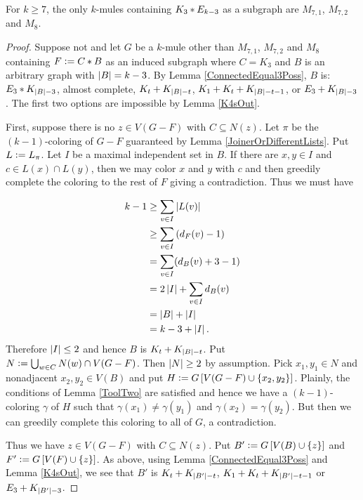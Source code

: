 \begin{lem}\label{K3sOut}
For $k \geq 7$, the only $k$-mules containing $K_3 \mbox{\hspace{2 pt}$\ast$\hspace{2 pt}} E_{k-3}$
as a subgraph are $M_{7,1}$,  $M_{7,2}$ and $M_8$.
\end{lem}
\begin{proof}
Suppose not and let $G$ be a $k$-mule other than $M_{7,1}$,  $M_{7,2}$ and $M_8$
containing $F \mathrel{\mathop:}= C \mbox{\hspace{2 pt}$\ast$\hspace{2 pt}} B$ as an induced subgraph where $C
= K_3$ and $B$ is an arbitrary graph with $\left|B\right| = k - 3$. By Lemma
\ref{ConnectedEqual3Poss}, $B$ is: $E_3 \mbox{\hspace{2 pt}$\ast$\hspace{2 pt}} K_{\left|B\right| - 3}$, almost
complete, $K_t \mbox{\hspace{2 pt}$+$\hspace{2 pt}} K_{\left|B\right| - t}$,
$K_1 \mbox{\hspace{2 pt}$+$\hspace{2 pt}} K_t \mbox{\hspace{2 pt}$+$\hspace{2 pt}} K_{\left|B\right| - t - 1}$, or
$E_3 \mbox{\hspace{2 pt}$+$\hspace{2 pt}} K_{\left|B\right| - 3}$.  The first two options are impossible by
Lemma \ref{K4sOut}.

First, suppose there is no $z \in V(G-F)$ with $C \subseteq N(z)$.  Let $\pi$
be the $(k-1)$-coloring of $G-F$ guaranteed by Lemma
\ref{JoinerOrDifferentLists}.  Put $L \mathrel{\mathop:}= L_\pi$. Let $I$ be a maximal
independent set in $B$. If there are $x,y \in I$ and $c \in L(x) \cap L(y)$,
then we may color $x$ and $y$ with $c$ and then greedily complete the coloring to the rest of $F$ giving a contradiction.  Thus
we must have

\begin{align*}
k - 1 &\geq \sum_{v \in I} \left|L(v)\right| \\
& \geq \sum_{v \in I} \left( d_F(v) - 1 \right) \\
&= \sum_{v \in I}(d_B(v) + 3 - 1)\\
&= 2 \left|I\right| + \sum_{v \in I} d_B(v) \\
&= \left|B\right| + \left|I\right| \\
&= k-3 + \left|I\right|. \\
\end{align*}
Therefore $\left|I\right| \leq 2$ and hence $B$ is $K_t \mbox{\hspace{2 pt}$+$\hspace{2 pt}} K_{\left|B\right| - t}$. 
Put $N \mathrel{\mathop:}= \bigcup_{w \in C} N(w) \cap V(G-F)$.  Then $\left|N\right| \geq 2$
by assumption.  Pick $x_1,y_1 \in N$ and nonadjacent $x_2, y_2 \in V(B)$ and put
$H \mathrel{\mathop:}= G\left[ V(G-F) \cup \left\{ x_2, y_2 \right\} \right]$.  Plainly, the conditions
of Lemma \ref{ToolTwo} are satisfied and hence we have a $(k - 1)$-coloring
$\gamma$ of $H$ such that $\gamma(x_1) \neq \gamma(y_1)$ and $\gamma(x_2) =
\gamma(y_2)$.  But then we can greedily complete this coloring to all of $G$, a
contradiction.

Thus we have $z \in V(G-F)$ with $C \subseteq N(z)$.  Put $B' \mathrel{\mathop:}=
G\left[ V(B) \cup \left\{ z \right\} \right]$ and $F' \mathrel{\mathop:}=
G\left[ V(F) \cup \left\{ z \right\} \right]$.  As above, using Lemma
\ref{ConnectedEqual3Poss} and Lemma \ref{K4sOut}, we see that $B'$ is
$K_t \mbox{\hspace{2 pt}$+$\hspace{2 pt}} K_{\left|B'\right| - t}$, $K_1 \mbox{\hspace{2 pt}$+$\hspace{2 pt}} K_t \mbox{\hspace{2 pt}$+$\hspace{2 pt}} K_{\left|B'\right| -
t - 1}$ or $E_3 \mbox{\hspace{2 pt}$+$\hspace{2 pt}} K_{\left|B'\right| - 3}$.  


\end{proof}
